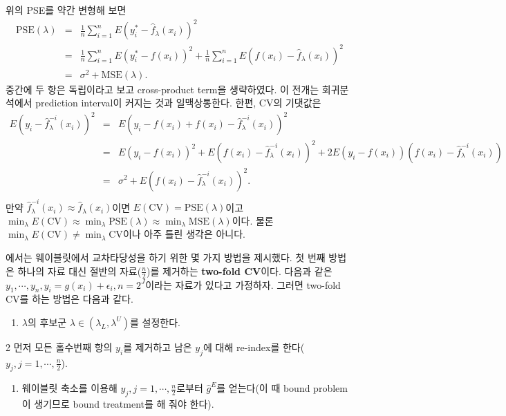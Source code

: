 \documentclass[b5paper,]{scrbook}
\providecommand{\tightlist}{%
  \setlength{\itemsep}{0pt}\setlength{\parskip}{0pt}}
\theoremstyle{plain}
\theoremstyle{definition}
\numberwithin{equation}{section}
\begin{document}
위의 PSE를 약간 변형해 보면
\begin{eqnarray*}
\text{PSE}(\lambda)&=&\frac{1}{n}\sum_{i=1}^{n}E(y_{i}^{*}-\hat{f}_{\lambda}(x_{i}))^{2}\\
&=&\frac{1}{n}\sum_{i=1}^{n}E(y_{i}^{*}-f(x_{i}))^{2}+\frac{1}{n}\sum_{i=1}^{n}E(f(x_{i})-\hat{f}_{\lambda}(x_{i}))^{2}\\
&=&\sigma^{2}+\text{MSE}(\lambda).
\end{eqnarray*}
중간에 두 항은 독립이라고 보고 cross-product term을 생략하였다. 이 전개는 회귀분석에서 prediction interval이 커지는 것과 일맥상통한다. 한편, CV의 기댓값은
\begin{eqnarray*}
E(y_{i}-\hat{f}_{\lambda}^{-i}(x_{i}))^{2}&=&E(y_{i}-f(x_{i})+f(x_{i})-\hat{f}_{\lambda}^{-i}(x_{i}))^{2}\\
&=&E(y_{i}-f(x_{i}))^{2}+E(f(x_{i})-\hat{f}_{\lambda}^{-i}(x_{i}))^{2}+2E(y_{i}-f(x_{i}))(f(x_{i})-\hat{f}_{\lambda}^{-i}(x_{i}))\\
&=&\sigma^{2}+E(f(x_{i})-\hat{f}_{\lambda}^{-i}(x_{i}))^{2}.\\
\end{eqnarray*}
만약 \(\hat{f}_{\lambda}^{-i}(x_{i}) \approx \hat{f}_{\lambda}(x_{i})\)이면 \(E(\text{CV})=\text{PSE}(\lambda)\)이고 \(\min_{\lambda}E(\text{CV}) \approx \min_{\lambda}\text{PSE}(\lambda) \approx \min_{\lambda}\text{MSE}(\lambda)\)이다. 물론 \(\min_{\lambda}E(\text{CV}) \neq \min_{\lambda}\text{CV}\)이나 아주 틀린 생각은 아니다.

\citep{Nason1996}에서는 웨이블릿에서 교차타당성을 하기 위한 몇 가지 방법을 제시했다. 첫 번째 방법은 하나의 자료 대신 절반의 자료(\(\frac{n}{2}\))를 제거하는 \textbf{two-fold CV}이다. 다음과 같은 \(y_{1}, \cdots, y_{n}, y_{i}=g(x_{i})+\epsilon_{i}, n=2^{J}\)이라는 자료가 있다고 가정하자. 그러면 two-fold CV를 하는 방법은 다음과 같다.

\begin{enumerate}
\def\labelenumi{\arabic{enumi}.}
\tightlist
\item
  \(\lambda\)의 후보군 \(\lambda \in (\lambda_{L}, \lambda^{U})\)를 설정한다.
\end{enumerate}

2 먼저 모든 홀수번째 항의 \(y_{i}\)를 제거하고 남은 \(y_{j}\)에 대해 re-index를 한다(\(y_{j},j=1,\cdots,\frac{n}{2}\)).

\begin{enumerate}
\def\labelenumi{\arabic{enumi}.}
\setcounter{enumi}{2}
\tightlist
\item
  웨이블릿 축소를 이용해 \(y_{j},j=1,\cdots,\frac{n}{2}\)로부터 \(\hat{g}^{E}\)를 얻는다(이 때 bound problem이 생기므로 bound treatment를 해 줘야 한다).
\end{enumerate}
\end{document}
